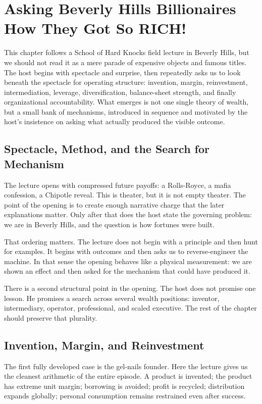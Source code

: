 \chapter{Asking Beverly Hills Billionaires How They Got So RICH!}

This chapter follows a School of Hard Knocks field lecture in Beverly Hills, but we should not read it as a mere parade of expensive objects and famous titles. The host begins with spectacle and surprise, then repeatedly asks us to look beneath the spectacle for operating structure: invention, margin, reinvestment, intermediation, leverage, diversification, balance-sheet strength, and finally organizational accountability. What emerges is not one single theory of wealth, but a small bank of mechanisms, introduced in sequence and motivated by the host's insistence on asking what actually produced the visible outcome.

\section{Spectacle, Method, and the Search for Mechanism}

The lecture opens with compressed future payoffs: a Rolls-Royce, a mafia confession, a Chipotle reveal. This is theater, but it is not empty theater. The point of the opening is to create enough narrative charge that the later explanations matter. Only after that does the host state the governing problem: we are in Beverly Hills, and the question is how fortunes were built.

That ordering matters. The lecture does not begin with a principle and then hunt for examples. It begins with outcomes and then asks us to reverse-engineer the machine. In that sense the opening behaves like a physical measurement: we are shown an effect and then asked for the mechanism that could have produced it.

There is a second structural point in the opening. The host does not promise one lesson. He promises a search across several wealth positions: inventor, intermediary, operator, professional, and scaled executive. The rest of the chapter should preserve that plurality.

\section{Invention, Margin, and Reinvestment}

The first fully developed case is the gel-nails founder. Here the lecture gives us the cleanest arithmetic of the entire episode. A product is invented; the product has extreme unit margin; borrowing is avoided; profit is recycled; distribution expands globally; personal consumption remains restrained even after success.

